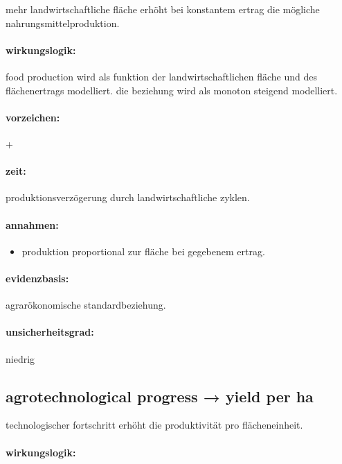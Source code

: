 \documentclass[11pt, a4paper, oneside]{scrartcl}
\begin{document}
mehr landwirtschaftliche fläche erhöht bei konstantem ertrag die mögliche nahrungsmittelproduktion.

\paragraph{wirkungslogik:}

food production wird als funktion der landwirtschaftlichen fläche und des flächenertrags modelliert. 
die beziehung wird als monoton steigend modelliert.

\paragraph{vorzeichen:}

+

\paragraph{zeit:} 

produktionsverzögerung durch landwirtschaftliche zyklen.

\paragraph{annahmen:}
\begin{itemize}
\item produktion proportional zur fläche bei gegebenem ertrag.
\end{itemize}

\paragraph{evidenzbasis:}

agrarökonomische standardbeziehung.

\paragraph{unsicherheitsgrad:} 

niedrig


\subsection{agrotechnological progress → yield per ha}

technologischer fortschritt erhöht die produktivität pro flächeneinheit.

\paragraph{wirkungslogik:}
\end{document}
